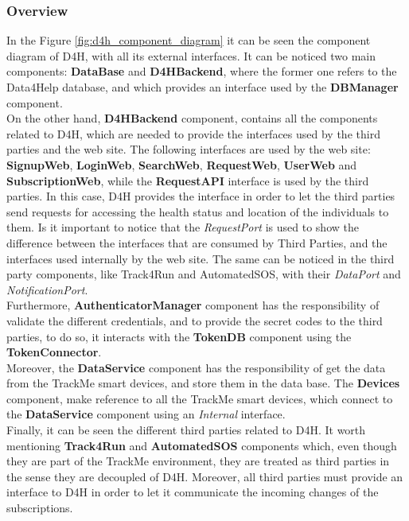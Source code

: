\documentclass[a4paper, hidelinks, 12pt]{report}
\begin{document}
			\subsubsection{Overview}
		In the Figure \ref{fig:d4h_component_diagram} it can be seen the component diagram of D4H, with all its external interfaces. It can be noticed two main components: \textbf{DataBase} and \textbf{D4HBackend}, where the former one refers to the Data4Help database, and which provides an interface used by the \textbf{DBManager} component. \\
		
		On the other hand, \textbf{D4HBackend} component, contains all the components related to D4H, which are needed to provide the interfaces used by the third parties and the web site. The following interfaces are used by the web site: \textbf{SignupWeb}, \textbf{LoginWeb}, \textbf{SearchWeb}, \textbf{RequestWeb}, \textbf{UserWeb} and  \textbf{SubscriptionWeb}, while the \textbf{RequestAPI} interface is used by the third parties. In this case, D4H provides the interface in order to let the third parties send requests for accessing the health status and location of the individuals to them. Is it important to notice that the \textit{RequestPort} is used to show the difference between the interfaces that are consumed by Third Parties, and the interfaces used internally by the web site. The same can be noticed in the third party components, like Track4Run and AutomatedSOS, with their \textit{DataPort} and \textit{NotificationPort}.\\
		
		Furthermore, \textbf{AuthenticatorManager} component has the responsibility of validate the different credentials, and to provide the secret codes to the third parties, to do so, it interacts with the \textbf{TokenDB} component using the \textbf{TokenConnector}.\\
		
		Moreover, the \textbf{DataService} component has the responsibility of get the data from the TrackMe smart devices, and store them in the data base. The \textbf{Devices} component, make reference to all the TrackMe smart devices, which connect to the \textbf{DataService} component using an \textit{Internal} interface.\\
		
		Finally, it can be seen the different third parties related to D4H. It worth mentioning \textbf{Track4Run} and \textbf{AutomatedSOS} components which, even though they are part of the TrackMe environment, they are treated as third parties in the sense they are decoupled of D4H. Moreover, all third parties must provide an interface to D4H in order to let it communicate the incoming changes of the subscriptions.
	
\end{document}
